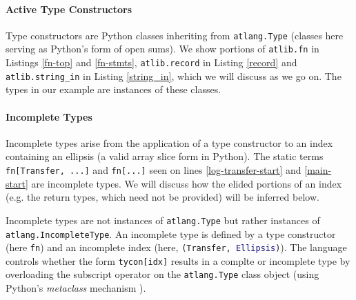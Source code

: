 \documentclass[9pt]{sigplanconf}
\newcommand{\lstinlinep}[1]{\lstinline[language=Python,basicstyle=\ttfamily\small,deletendkeywords={tuple,buffer,map}]{#1}}
\begin{document}
\paragraph{Active Type Constructors} Type constructors are Python classes inheriting from \lstinlinep{atlang.Type} (classes here serving as Python's form of open sums). We show portions of \lstinlinep{atlib.fn} in Listings \ref{fn-top} and \ref{fn-stmts}, \lstinlinep{atlib.record} in Listing \ref{record} and \lstinlinep{atlib.string_in} in Listing \ref{string_in}, which we will discuss as we go on. The types in our example are instances of these classes.

\paragraph{Incomplete Types} Incomplete types arise from the application of a type constructor to an index containing an ellipsis (a valid array slice form in Python). The static terms \lstinlinep{fn[Transfer, ...]} and \lstinlinep{fn[...]} seen on lines \ref{log-transfer-start} and \ref{main-start} are incomplete types. We will discuss how the elided portions of an index (e.g. the return types, which need not be provided) will be inferred below.

Incomplete types are not instances of \lstinlinep{atlang.Type} but rather instances of \lstinlinep{atlang.IncompleteType}. An incomplete type is defined by a type constructor (here \lstinlinep{fn}) and an incomplete index (here, \lstinlinep{(Transfer, Ellipsis)}).  The language controls whether the form \lstinlinep{tycon[idx]} results in a complte or incomplete type by overloading the subscript operator on the \lstinlinep{atlang.Type} class object (using Python's \emph{metaclass} mechanism \cite{python}).
\end{document}
